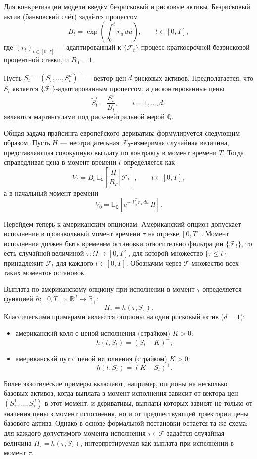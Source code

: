 Для конкретизации модели введём безрисковый и рисковые активы.
Безрисковый актив (банковский счёт) задаётся процессом
\[
B_t = \exp\!\left(\int_0^t r_u\,du\right), \qquad t\in[0,T],
\]
где $(r_t)_{t\in[0,T]}$ --- адаптированный к $\{\mathcal F_t\}$ процесс
краткосрочной безрисковой процентной ставки, и $B_0 = 1$.

Пусть $S_t = (S_t^1,\dots,S_t^d)^\top$ --- вектор цен $d$ рисковых
активов. Предполагается, что $S_t$ является $\{\mathcal F_t\}$-адаптированным
процессом, а дисконтированные цены
\[
\tilde S_t^i = \frac{S_t^i}{B_t}, \qquad i=1,\dots,d,
\]
являются мартингалами под риск-нейтральной мерой $\mathbb Q$.

Общая задача прайсинга европейского дериватива формулируется следующим
образом. Пусть $H$ --- неотрицательная $\mathcal F_T$-измеримая
случайная величина, представляющая совокупную выплату по контракту в
момент времени $T$. Тогда справедливая цена в момент времени $t$
определяется как
\[
V_t = B_t\, \mathbb E_{\mathbb Q}\!\left[
\left.\frac{H}{B_T}\right|\,\mathcal F_t\right],
\qquad t\in[0,T],
\]
а в начальный момент времени
\[
V_0 = \mathbb E_{\mathbb Q}\!\left[
e^{-\int_0^T r_u\,du}\, H \right].
\]

Перейдём теперь к американским опционам. Американский опцион допускает
исполнение в произвольный момент времени $\tau$ на отрезке $[0,T]$.
Момент исполнения должен быть временем остановки относительно
фильтрации $\{\mathcal F_t\}$, то есть случайной величиной
$\tau:\Omega\to[0,T]$, для которой множество $\{\tau\le t\}$ принадлежит
$\mathcal F_t$ для каждого $t\in[0,T]$. Обозначим через $\mathcal T$
множество всех таких моментов остановок.

Выплата по американскому опциону при исполнении в момент $\tau$
определяется функцией $h:[0,T]\times\mathbb R^d\to\mathbb R_+$:
\[
H_\tau = h(\tau, S_\tau).
\]
Классическими примерами являются опционы на один рисковый актив
($d=1$):
\begin{itemize}
  \item американский колл с ценой исполнения (страйком) $K>0$:
  \[
  h(t, S_t) = (S_t - K)^+;
  \]
  \item американский пут с ценой исполнения (страйком) $K>0$:
  \[
  h(t, S_t) = (K - S_t)^+.
  \]
\end{itemize}


Более экзотические примеры включают, например, опционы на несколько
базовых активов, когда выплата в момент исполнения зависит от вектора
цен $(S_\tau^1,\dots,S_\tau^d)$ в этот момент, и деривативы, выплаты
которых зависят не только от значения цены в момент исполнения, но и от
предшествующей траектории цены базового актива.
Однако в основе
формальной постановки остаётся та же схема: для каждого допустимого
момента исполнения $\tau\in\mathcal T$ задаётся случайная величина
$H_\tau = h(\tau, S_\tau)$, интерпретируемая как выплата при исполнении
в момент $\tau$.


